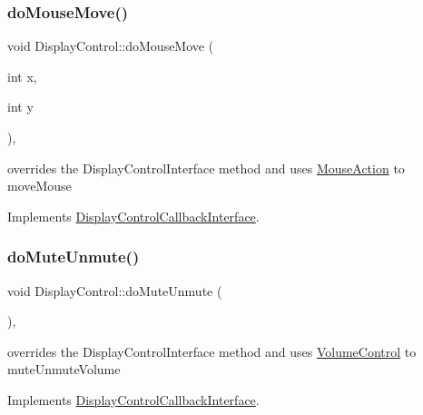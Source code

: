 \mbox{\label{classDisplayControl_aa8c509a1e17ba12d164dcfe43cf281d4}} 
\subsubsection{\texorpdfstring{do\+Mouse\+Move()}{doMouseMove()}}
{\footnotesize\ttfamily void Display\+Control\+::do\+Mouse\+Move (\begin{DoxyParamCaption}\item[{int}]{x,  }\item[{int}]{y }\end{DoxyParamCaption})\hspace{0.3cm}{\ttfamily [override]}, {\ttfamily [virtual]}}

overrides the Display\+Control\+Interface method and uses \hyperlink{classMouseAction}{Mouse\+Action} to move\+Mouse 

Implements \hyperlink{classDisplayControlCallbackInterface_ab7abee0745e5313dc50fe33c0206310a}{Display\+Control\+Callback\+Interface}.

\mbox{\label{classDisplayControl_a25f685ea6bf001e53c7d17410f2a24ea}} 
\subsubsection{\texorpdfstring{do\+Mute\+Unmute()}{doMuteUnmute()}}
{\footnotesize\ttfamily void Display\+Control\+::do\+Mute\+Unmute (\begin{DoxyParamCaption}{ }\end{DoxyParamCaption})\hspace{0.3cm}{\ttfamily [override]}, {\ttfamily [virtual]}}

overrides the Display\+Control\+Interface method and uses \hyperlink{classVolumeControl}{Volume\+Control} to mute\+Unmute\+Volume 

Implements \hyperlink{classDisplayControlCallbackInterface_a2826e548e2701baa4990422e0671b233}{Display\+Control\+Callback\+Interface}.

\mbox{\label{classDisplayControl_a874fa3f6b3e4cf465db62a4eba1c1dd1}} 
